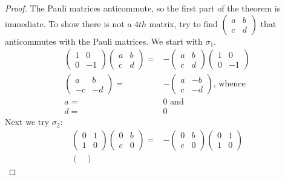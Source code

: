 \documentclass[]{article}
\begin{document}
\begin{proof}
	The Pauli matrices anticommute, so the first part of the theorem is immediate. To show there is not a $4th$ matrix, try to find $\begin{pmatrix}
		a & b\\
		c & d
	\end{pmatrix}$ that anticommutes with the Pauli matrices. We start with $\sigma_1$.
	\begin{align*}
		\begin{pmatrix}
			1 & 0\\
			0 & -1
		\end{pmatrix}	\begin{pmatrix}
		a & b\\
		c & d
		\end{pmatrix} =& -	\begin{pmatrix}
		a & b\\
		c & d
		\end{pmatrix}	\begin{pmatrix}
		1 & 0\\
		0 & -1
		\end{pmatrix}\\
		\begin{pmatrix}
			a & b\\
			-c & -d
		\end{pmatrix} =& - \begin{pmatrix}
			a & -b\\
			c & -d
		\end{pmatrix} \text{, whence}\\
		a=&0 \text{ and} \\
		d=&0
	\end{align*}
	Next we try $\sigma_2$:
	\begin{align*}
		\begin{pmatrix}
			0 & 1\\
			1 & 0
		\end{pmatrix} \begin{pmatrix}
			0 & b\\
			c & 0
		\end{pmatrix} =& -\begin{pmatrix}
			0 & b\\
			c & 0
		\end{pmatrix} \begin{pmatrix}
			0 & 1\\
			1 & 0
		\end{pmatrix}\\
		\begin{pmatrix}

\end{pmatrix}
\end{align*}
\end{proof}
\end{document}
